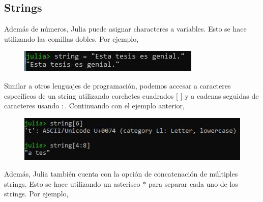 


\subsection{Strings} 

Además de números, Julia puede asignar characteres a variables. Esto se hace utilizando las comillas dobles. Por ejemplo, 

\begin{figure}[h]
\begin{center}
\includegraphics[scale=0.8]{Imagenes/ejemplo_string.JPG}
  \label{ejemplo_string_julia}
\end{center}
\end{figure}

Similar a otros lenguajes de programación, podemos accesar a caracteres específicos de un string utilizando corchetes cuadrados $[$ $]$ y a cadenas seguidas de caracteres usando $:$. Continuando con el ejemplo anterior, 
\begin{figure}[h]
\begin{center}
\includegraphics[scale=0.8]{Imagenes/ejemplo_string_partes.JPG}
  \label{ejemplo_string_julia_partes}
\end{center}
\end{figure}

Además, Julia también cuenta con la opción de concatenación de múltiples strings. Esto se hace utilizando un asterisco $*$ para separar cada uno de los strings. Por ejemplo,

